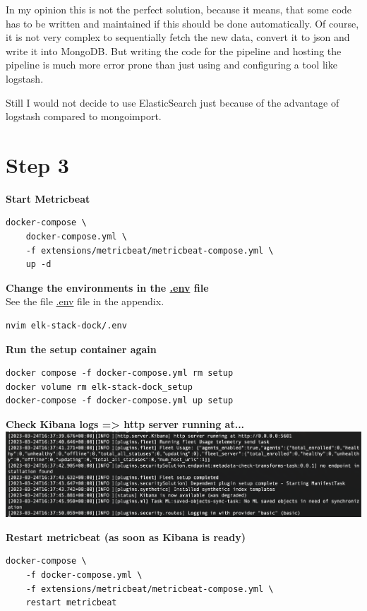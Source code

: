 \documentclass[14pt,a4paper]{extarticle}
\begin{document}
	\noindent 
	In my opinion this is not the perfect solution, because it means, that some code has to be written and maintained if this should be done automatically.
	Of course, it is not very complex to sequentially fetch the new data, convert it to json and write it into MongoDB.
	But writing the code for the pipeline and hosting the pipeline is much more error prone than just using and configuring a tool like logstash.

	Still I would not decide to use ElasticSearch just because of the advantage of logstash compared to mongoimport.
	\newpage

	\section*{Step 3}
	\noindent \textbf{Start Metricbeat}
	\begin{lstlisting}[style=fish]
docker-compose \
	docker-compose.yml \
	-f extensions/metricbeat/metricbeat-compose.yml \
	up -d
	\end{lstlisting}

	\noindent \textbf{Change the environments in the \hyperref[listings:envs]{.env} file} \\
	See the file \hyperref[listings:envs]{.env} file in the appendix.
	\begin{lstlisting}[style=fish]
nvim elk-stack-dock/.env
	\end{lstlisting}

	\noindent \textbf{Run the setup container again}
	\begin{lstlisting}[style=fish]
docker compose -f docker-compose.yml rm setup 
docker volume rm elk-stack-dock_setup 
docker-compose -f docker-compose.yml up setup
	\end{lstlisting}

	\noindent \textbf{Check Kibana logs => http server running at...} \\
	\includegraphics[width=\textwidth]{images/sc10.png}

	\noindent \textbf{Restart metricbeat (as soon as Kibana is ready)}
	\begin{lstlisting}[style=fish]
docker-compose \
	-f docker-compose.yml \
	-f extensions/metricbeat/metricbeat-compose.yml \
	restart metricbeat
	\end{lstlisting}
\end{document}
